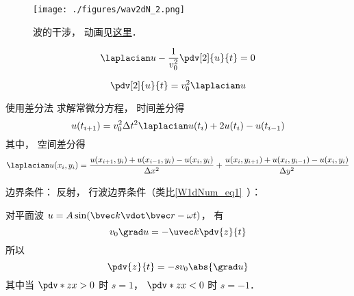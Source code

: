 
\begin{issues}
\issueDraft
\end{issues}


\begin{figure}[ht]
\centering
\texttt{[image: ./figures/wav2dN\_2.png]}
\caption{波的干涉， 动画见\href{https://wuli.wiki/apps/wav2D.html}{这里}．} \label{wav2dN_fig2}
\end{figure}

\begin{equation}
\laplacian u - \frac{1}{v_0^2}\pdv[2]{u}{t} = 0
\end{equation}

\begin{equation}
\pdv[2]{u}{t} = v_0^2\laplacian u
\end{equation}

使用差分法 求解常微分方程， 时间差分得
\begin{equation}
u(t_{i+1}) = v_0^2\Delta t^2\laplacian u(t_i) + 2u(t_{i}) - u(t_{i-1})
\end{equation}
其中， 空间差分得
\begin{equation}
\laplacian u(x_i,y_i) = \frac{u(x_{i+1}, y_i) + u(x_{i-1}, y_i) - u(x_{i}, y_i)}{\Delta x^2}
+ \frac{u(x_i, y_{i+1}) + u(x_i, y_{i-1}) - u(x_i, y_{i})}{\Delta y^2}
\end{equation}

边界条件： 反射， 行波边界条件（类比\autoref{W1dNum_eq1}~）：

对平面波 $u = A\sin(\bvec k\vdot\bvec r - \omega t)$， 有
\begin{equation}
v_0\grad u = -\uvec k \pdv{z}{t}
\end{equation}
所以
\begin{equation}
\pdv{z}{t} = -s v_0\abs{\grad u}
\end{equation}
其中当 $\pdv*{z}{x} > 0$ 时 $s = 1$， $\pdv*{z}{x} < 0$ 时 $s = -1$．

